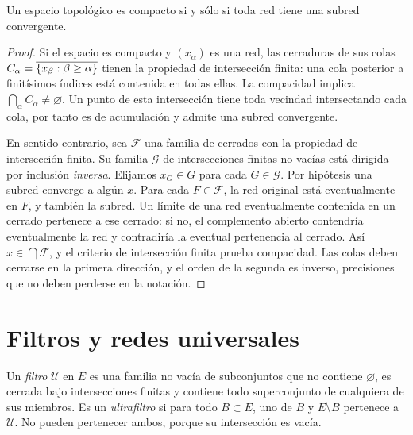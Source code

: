 \begin{teorema}\label{v3:compacto-redes}
Un espacio topológico es compacto si y sólo si toda red tiene una subred convergente.
\end{teorema}
\begin{proof}
Si el espacio es compacto y $(x_\alpha)$ es una red, las cerraduras de sus colas $C_\alpha=\overline{\{x_\beta:\beta\ge\alpha\}}$ tienen la propiedad de intersección finita: una cola posterior a finitísimos índices está contenida en todas ellas. La compacidad implica $\bigcap_\alpha C_\alpha\ne\varnothing$. Un punto de esta intersección tiene toda vecindad intersectando cada cola, por tanto es de acumulación y admite una subred convergente.

En sentido contrario, sea $\mathcal F$ una familia de cerrados con la propiedad de intersección finita. Su familia $\mathcal G$ de intersecciones finitas no vacías está dirigida por inclusión \emph{inversa}. Elijamos $x_G\in G$ para cada $G\in\mathcal G$. Por hipótesis una subred converge a algún $x$. Para cada $F\in\mathcal F$, la red original está eventualmente en $F$, y también la subred. Un límite de una red eventualmente contenida en un cerrado pertenece a ese cerrado: si no, el complemento abierto contendría eventualmente la red y contradiría la eventual pertenencia al cerrado. Así $x\in\bigcap\mathcal F$, y el criterio de intersección finita prueba compacidad. Las colas deben cerrarse en la primera dirección, y el orden de la segunda es inverso, precisiones que no deben perderse en la notación.
\end{proof}

\section{Filtros y redes universales}
Un \emph{filtro} $\mathcal U$ en $E$ es una familia no vacía de subconjuntos que no contiene $\varnothing$, es cerrada bajo intersecciones finitas y contiene todo superconjunto de cualquiera de sus miembros. Es un \emph{ultrafiltro} si para todo $B\subset E$, uno de $B$ y $E\setminus B$ pertenece a $\mathcal U$. No pueden pertenecer ambos, porque su intersección es vacía.

